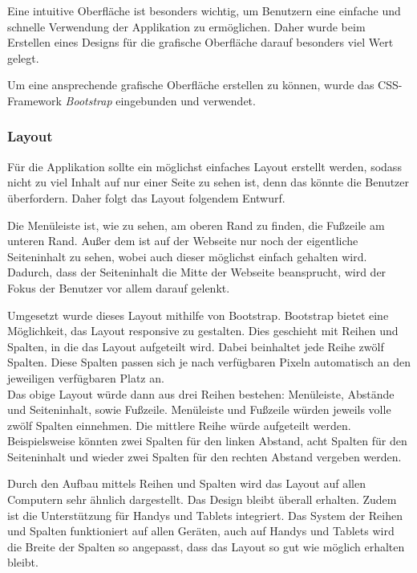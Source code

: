 
Eine intuitive Oberfläche ist besonders wichtig, um Benutzern eine einfache und schnelle Verwendung der Applikation zu ermöglichen. Daher wurde beim Erstellen eines Designs für die grafische Oberfläche darauf besonders viel Wert gelegt.

Um eine ansprechende grafische Oberfläche erstellen zu können, wurde das CSS-Framework \textit{Bootstrap} eingebunden und verwendet.

\subsubsection{Layout}
Für die Applikation sollte ein möglichst einfaches Layout erstellt werden, sodass nicht zu viel Inhalt auf nur einer Seite zu sehen ist, denn das könnte die Benutzer überfordern. Daher folgt das Layout folgendem Entwurf.


Die Menüleiste ist, wie zu sehen, am oberen Rand zu finden, die Fußzeile am unteren Rand. Außer dem ist auf der Webseite nur noch der eigentliche Seiteninhalt zu sehen, wobei auch dieser möglichst einfach gehalten wird. Dadurch, dass der Seiteninhalt die Mitte der Webseite beansprucht, wird der Fokus der Benutzer vor allem darauf gelenkt.

\newpage

Umgesetzt wurde dieses Layout mithilfe von Bootstrap. Bootstrap bietet eine Möglichkeit, das Layout responsive zu gestalten. Dies geschieht mit Reihen und Spalten, in die das Layout aufgeteilt wird. Dabei beinhaltet jede Reihe zwölf Spalten. Diese Spalten passen sich je nach verfügbaren Pixeln automatisch an den jeweiligen verfügbaren Platz an.\\
Das obige Layout würde dann aus drei Reihen bestehen: Menüleiste, Abstände und Seiteninhalt, sowie Fußzeile. Menüleiste und Fußzeile würden jeweils volle zwölf Spalten einnehmen. Die mittlere Reihe würde aufgeteilt werden. Beispielsweise könnten zwei Spalten für den linken Abstand, acht Spalten für den Seiteninhalt und wieder zwei Spalten für den rechten Abstand vergeben werden.

Durch den Aufbau mittels Reihen und Spalten wird das Layout auf allen Computern sehr ähnlich dargestellt. Das Design bleibt überall erhalten. Zudem ist die Unterstützung für Handys und Tablets integriert. Das System der Reihen und Spalten funktioniert auf allen Geräten, auch auf Handys und Tablets wird die Breite der Spalten so angepasst, dass das Layout so gut wie möglich erhalten bleibt.

